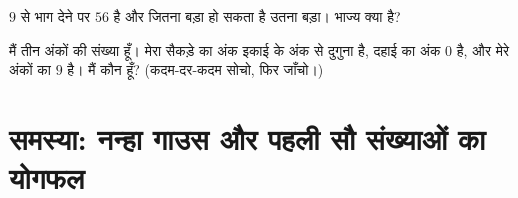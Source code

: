 \begin{exercise}[$\star\star$]\label{exo:g6:wholes:11}
$9$ से भाग देने पर  $56$ है और  जितना बड़ा हो सकता है
उतना बड़ा। भाज्य क्या है?
\end{exercise}

\begin{exercise}[$\star\star\star$]\label{exo:g6:wholes:12}
मैं तीन अंकों की संख्या हूँ। मेरा सैकड़े का अंक इकाई के अंक से
दुगुना है, दहाई का अंक $0$ है, और मेरे अंकों का  $9$ है। मैं कौन हूँ?
(कदम-दर-कदम सोचो, फिर जाँचो।)
\end{exercise}

\section{समस्या: नन्हा गाउस और पहली सौ संख्याओं का
योगफल}

